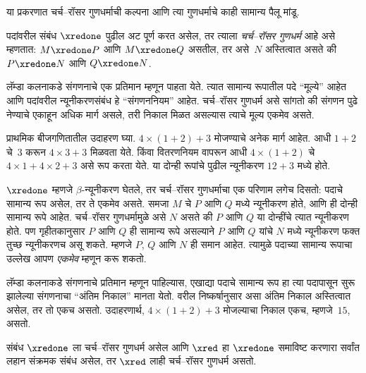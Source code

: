 \documentclass[../../../include/open-logic-section]{subfiles}
\begin{document}


या प्रकरणात चर्च–रॉसर गुणधर्माची कल्पना आणि त्या
गुणधर्माचे काही सामान्य पैलू मांडू.

\begin{defn}[चर्च–रॉसर गुणधर्म, CR] पदांवरील संबंध $\xredone$
  पुढील अट पूर्ण करत असेल, तर त्याला \emph{चर्च–रॉसर गुणधर्म}
  आहे असे म्हणतात: $M \xredone P$ आणि $M \xredone Q$
  असतील, तर असे~$N$ अस्तित्वात असते की
  $P \xredone N$ आणि $Q \xredone N$.
\end{defn}

लॅम्डा कलनाकडे संगणनाचे एक प्रतिमान म्हणून पाहता येते.
त्यात सामान्य रूपातील पदे ``मूल्ये'' आहेत आणि पदांवरील
न्यूनीकरणसंबंध हे ``संगणननियम'' आहेत. चर्च–रॉसर गुणधर्म
असे सांगतो की संगणन पुढे नेण्याचे एकाहून अधिक मार्ग
असले, तरी निकाल मिळत असल्यास त्याचे मूल्य एकमेव असते.

प्राथमिक बीजगणितातील उदाहरण घ्या. $4 \times (1+2) + 3$
मोजण्याचे अनेक मार्ग आहेत. आधी $1+2$ चे~$3$ करून
$4
\times 3+3$ मिळवता येते. किंवा वितरणनियम वापरून
आधी $4 \times (1+2)$ चे $4 \times 1+4
\times 2+3$ असे रूप करता येते. या दोन्ही रूपांचे
पुढील न्यूनीकरण $12+3$ मध्ये होते.

$\xredone$ म्हणजे $\beta$-न्यूनीकरण घेतले, तर
चर्च–रॉसर गुणधर्माचा एक परिणाम लगेच दिसतो:
पदाचे सामान्य रूप असेल, तर ते एकमेव असते.
समजा $M$ चे $P$ आणि $Q$ मध्ये न्यूनीकरण होते,
आणि ही दोन्ही सामान्य रूपे आहेत. चर्च–रॉसर गुणधर्मामुळे
असे $N$ असते की $P$ आणि $Q$ या दोन्हींचे त्यात
न्यूनीकरण होते. पण गृहीतकानुसार $P$ आणि $Q$ ही
सामान्य रूपे असल्याने $P$ आणि $Q$ यांचे $N$ मध्ये
न्यूनीकरण फक्त तुच्छ न्यूनीकरणच असू शकते.
म्हणजे $P$, $Q$ आणि $N$ ही समान आहेत.
त्यामुळे पदाच्या सामान्य रूपाचा उल्लेख आपण
\emph{एकमेव} म्हणून करू शकतो.

लॅम्डा कलनाकडे संगणनाचे प्रतिमान म्हणून पाहिल्यास,
एखाद्या पदाचे सामान्य रूप हा त्या पदापासून सुरू झालेल्या
संगणनाचा ``अंतिम निकाल'' मानता येतो. वरील निष्कर्षानुसार
असा अंतिम निकाल अस्तित्वात असेल, तर तो एकच असतो.
उदाहरणार्थ, $4 \times (1+2)+3$ मोजल्याचा निकाल
एकच, म्हणजे~$15$, असतो.

\begin{thm} 
  संबंध $\xredone$ ला चर्च–रॉसर गुणधर्म असेल आणि
  $\xred$ हा $\xredone$ समाविष्ट करणारा सर्वांत लहान
  संक्रमक संबंध असेल, तर $\xred$ लाही चर्च–रॉसर
  गुणधर्म असतो.
\end{thm}
\end{document}

